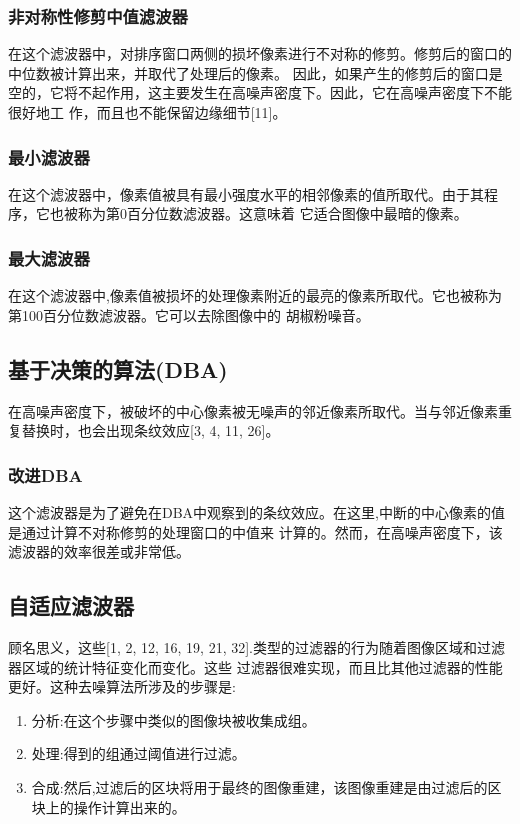 \documentclass[12pt]{article} %
\begin{document}
\subsubsection{非对称性修剪中值滤波器}
在这个滤波器中，对排序窗口两侧的损坏像素进行不对称的修剪。修剪后的窗口的中位数被计算出来，并取代了处理后的像素。
因此，如果产生的修剪后的窗口是空的，它将不起作用，这主要发生在高噪声密度下。因此，它在高噪声密度下不能很好地工
作，而且也不能保留边缘细节[11]。

\subsubsection{最小滤波器}
在这个滤波器中，像素值被具有最小强度水平的相邻像素的值所取代。由于其程序，它也被称为第0百分位数滤波器。这意味着
它适合图像中最暗的像素。

\subsubsection{最大滤波器}
在这个滤波器中,像素值被损坏的处理像素附近的最亮的像素所取代。它也被称为第100百分位数滤波器。它可以去除图像中的
胡椒粉噪音。

\subsection{基于决策的算法(DBA)}
在高噪声密度下，被破坏的中心像素被无噪声的邻近像素所取代。当与邻近像素重复替换时，也会出现条纹效应[3, 4, 11, 26]。

\subsubsection{改进DBA}
这个滤波器是为了避免在DBA中观察到的条纹效应。在这里,中断的中心像素的值是通过计算不对称修剪的处理窗口的中值来
计算的。然而，在高噪声密度下，该滤波器的效率很差或非常低。

\subsection{自适应滤波器}
顾名思义，这些[1, 2, 12, 16, 19, 21, 32].类型的过滤器的行为随着图像区域和过滤器区域的统计特征变化而变化。这些
过滤器很难实现，而且比其他过滤器的性能更好。这种去噪算法所涉及的步骤是:
\begin{enumerate}
    \item 分析:在这个步骤中类似的图像块被收集成组。
    \item 处理:得到的组通过阈值进行过滤。
    \item 合成:然后,过滤后的区块将用于最终的图像重建，该图像重建是由过滤后的区块上的操作计算出来的。
\end{enumerate}
\end{document}
